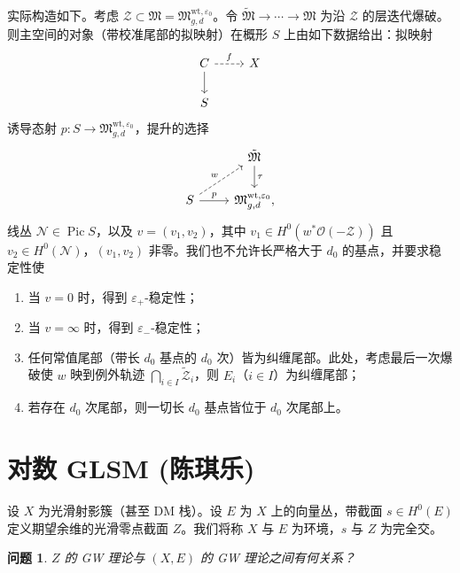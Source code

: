 \documentclass{amsart}
\newtheorem{quest}[thm]{问题}
\theoremstyle{definition}
\theoremstyle{remark}
\theoremstyle{plain}
\theoremstyle{definition}
\theoremstyle{remark}
\newcommand{\ep}{\varepsilon}
\newcommand{\mc}[1]{\mathcal{#1}}
\newcommand{\mf}[1]{\mathfrak{#1}}
\newcommand{\mr}[1]{\mathrm{#1}}
\newcommand{\1}{\mathbf{1}}
\newcommand{\2}{\mathbf{2}}
\newcommand{\3}{\mathbf{3}}
\DeclareMathOperator{\Pic}{Pic}
\begin{document}
实际构造如下。考虑 \(\mc{Z} \subset \mf{M} = \mf{M}_{g,d}^{\mr{wt}, \ep_0}\)。令 \(\tilde{\mf{M}} \to \cdots \to \mf{M}\) 为沿 \(\mc{Z}\) 的层迭代爆破。则主空间的对象（带校准尾部的拟映射）在概形 \(S\) 上由如下数据给出：拟映射
\begin{equation*}
\begin{tikzcd}
    C \ar{d} \ar[dashrightarrow]{r}{f} & X \\
    S
\end{tikzcd}
\end{equation*}
诱导态射 \(p \colon S \to \mf{M}_{g,d}^{\mr{wt}, \ep_0}\)，提升的选择
\begin{equation*}
\begin{tikzcd}
    & \tilde{\mf{M}} \ar{d}{\tau} \\
    S \ar{r}{p} \ar[dashrightarrow]{ur}{w} & \mf{M}_{g,d}^{\mr{wt}, \ep_0},
\end{tikzcd}
\end{equation*}
线丛 \(\mc{N} \in \Pic S\)，以及 \(v = (v_1, v_2)\)，其中 \(v_1 \in H^0(w^* \mc{O}(-\mc{Z}))\) 且 \(v_2 \in H^0(\mc{N})\)，\((v_1, v_2)\) 非零。我们也不允许长严格大于 \(d_0\) 的基点，并要求稳定性使
\begin{enumerate}
    \item 当 \(v = 0\) 时，得到 \(\ep_+\)-稳定性；
    \item 当 \(v = \infty\) 时，得到 \(\ep_-\)-稳定性；
    \item 任何常值尾部（带长 \(d_0\) 基点的 \(d_0\) 次）皆为纠缠尾部。此处，考虑最后一次爆破使 \(w\) 映到例外轨迹 \(\bigcap_{i \in I} \tilde{\mc{Z}}_i\)，则 \(E_i\)（\(i \in I\)）为纠缠尾部；
    \item 若存在 \(d_0\) 次尾部，则一切长 \(d_0\) 基点皆位于 \(d_0\) 次尾部上。
\end{enumerate}







\section{对数 GLSM (陈琪乐)}%
\label{sec:Log GLSM (Qile Chen)}

设 \(X\) 为光滑射影簇（甚至 DM 栈）。设 \(E\) 为 \(X\) 上的向量丛，带截面 \(s \in H^0(E)\) 定义期望余维的光滑零点截面 \(Z\)。我们将称 \(X\) 与 \(E\) 为环境，\(s\) 与 \(Z\) 为完全交。

\begin{quest}
    \(Z\) 的 GW 理论与 \((X, E)\) 的 GW 理论之间有何关系？
\end{quest}
\end{document}
